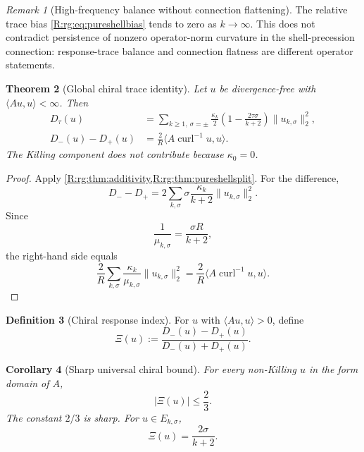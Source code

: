 \documentclass[
 aps,
 prd,
 reprint,
 amsmath,
 amssymb,
 nofootinbib,
 superscriptaddress
]{revtex4-2}
\newtheorem{theorem}{Theorem}[section]
\newtheorem{corollary}[theorem]{Corollary}
\theoremstyle{definition}
\newtheorem{definition}[theorem]{Definition}
\theoremstyle{remark}
\newtheorem{remark}[theorem]{Remark}
\newcommand{\curl}{\operatorname{curl}}
\begin{document}
\begin{remark}[High-frequency balance without connection flattening]
The relative trace bias \eqref{R:rg:eq:pureshellbias} tends to zero as
$k\to\infty$.  This does not contradict persistence of nonzero
operator-norm curvature in the shell-precession connection: response-trace
balance and connection flatness are different operator statements.
\end{remark}

\begin{theorem}[Global chiral trace identity]
\label{R:rg:thm:globalchiral}
Let $u$ be divergence-free with $\langle Au,u\rangle<\infty$.  Then
\begin{align}
 D_\tau(u)
 &=
 \sum_{k\ge1,\ \sigma=\pm}
 \frac{\kappa_k}{2}
 \left(
 1-\frac{2\tau\sigma}{k+2}
 \right)
 \|u_{k,\sigma}\|_2^2,
 \label{R:rg:eq:Dtauglobal}\\
 D_-(u)-D_+(u)
 &=
 \frac{2}{R}
 \langle A\curl^{-1}u,u\rangle.
 \label{R:rg:eq:chiraltraceidentity}
\end{align}
The Killing component does not contribute because $\kappa_0=0$.
\end{theorem}

\begin{proof}
Apply \cref{R:rg:thm:additivity,R:rg:thm:pureshellsplit}.  For the difference,
\[
 D_--D_+
 =
 2\sum_{k,\sigma}
 \sigma\frac{\kappa_k}{k+2}
 \|u_{k,\sigma}\|_2^2.
\]
Since
\[
 \frac{1}{\mu_{k,\sigma}}
 =
 \frac{\sigma R}{k+2},
\]
the right-hand side equals
\[
 \frac{2}{R}
 \sum_{k,\sigma}
 \frac{\kappa_k}{\mu_{k,\sigma}}
 \|u_{k,\sigma}\|_2^2
 =
 \frac{2}{R}
 \langle A\curl^{-1}u,u\rangle.
\]
\end{proof}

\begin{definition}[Chiral response index]
For $u$ with $\langle Au,u\rangle>0$, define
\begin{equation}
 \Xi(u)
 :=
 \frac{D_-(u)-D_+(u)}
      {D_-(u)+D_+(u)}.
 \label{R:rg:eq:Xi}
\end{equation}
\end{definition}

\begin{corollary}[Sharp universal chiral bound]
\label{R:rg:cor:Xibound}
For every non-Killing $u$ in the form domain of $A$,
\begin{equation}
 \boxed{
 |\Xi(u)|
 \le
 \frac{2}{3}.
 }
 \label{R:rg:eq:Xibound}
\end{equation}
The constant $2/3$ is sharp.  For $u\in E_{k,\sigma}$,
\begin{equation}
 \boxed{
 \Xi(u)=\frac{2\sigma}{k+2}.
 }
 \label{R:rg:eq:Xipureshell}
\end{equation}
\end{corollary}
\end{document}
